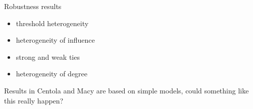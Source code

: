 \documentclass[aspectratio=169]{beamer}
\begin{document}
\begin{frame}

Robustness results
\begin{itemize}
\item threshold heterogeneity
\item heterogeneity of influence
\item strong and weak ties
\item heterogeneity of degree
\end{itemize} 

\end{frame}
\begin{frame}

Results in Centola and Macy are based on simple models, could something like this really happen?

\end{frame}
\end{document}
